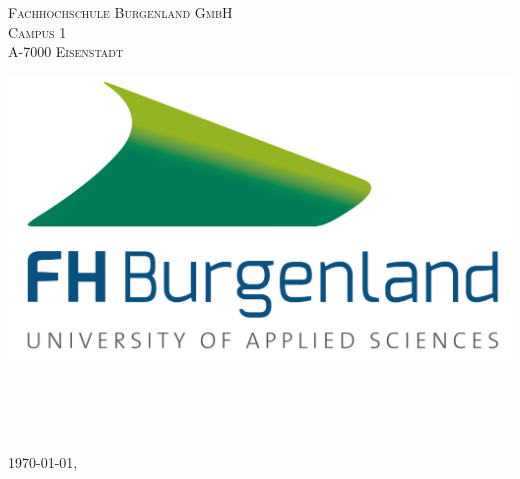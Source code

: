 \makeatletter

\begin{titlepage}
\noindent
\begin{minipage}[t]{0.5\textwidth}
\vspace{0pt} %
\textsc{Fachhochschule Burgenland GmbH\\Campus 1\\A-7000 Eisenstadt}
\end{minipage}%
\hfill
\begin{minipage}[t]{0.4\textwidth}
\vspace{0pt} %
\raggedleft %
\includegraphics[scale=0.4]{images/logofh}
\end{minipage}


\begin{center}
{ \huge \bfseries \@title}\\[0.4cm]
\subtitle\\
\end{center}


\vfills
\begin{minipage}{\textwidth}
\@author\\
\supervisor\\
\today, \city\\
\end{minipage}


\end{titlepage}